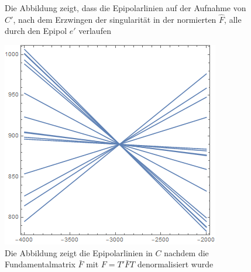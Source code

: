 \begin{figure}[!htb]
	\caption[Epipolarlinien in $C'$ aus singulärer Fundamentalmatrix ]{Die Abbildung zeigt, dass die Epipolarlinien auf der Aufnahme von $C'$, nach dem Erzwingen der singularität in der normierten $\hat{F}$, alle durch den Epipol $e'$ verlaufen}
	\label{fig:EpipoleWithF2}
	\endminipage\hfill
\end{figure}

\begin{figure}[!htb]
	\includegraphics[width=\linewidth]{images/L_PC1_F_Constraint_denormalized.png}
	\caption[Epipolarlinien in $C$ aus singulärer denormalisierter Fundamentalmatrix]{Die Abbildung zeigt die Epipolarlinien in $C$ nachdem die Fundamentalmatrix $\bar{F}$ mit $F = T'\bar{F}T$ denormalisiert wurde}
	\label{fig:EpipoleWithF1Denorm}
	\endminipage\hfill

\end{figure}
